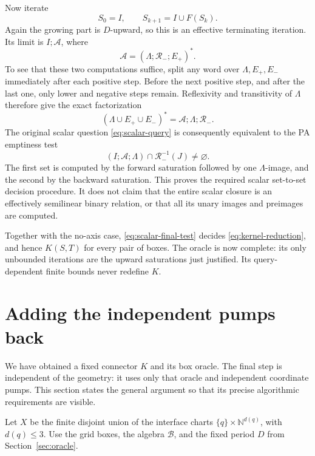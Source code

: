 \documentclass[11pt,a4paper]{article}
\theoremstyle{remark}
\newcommand{\N}{\mathbb N}
\begin{document}
Now iterate
\begin{equation}
 S_0=I,\qquad S_{k+1}=I\cup F(S_k).
 \label{eq:scalar-forward-saturation}
\end{equation}
Again the growing part is \(D\)-upward, so this is an effective
terminating iteration.  Its limit is \(I;\mathcal A\), where
\[
 \mathcal A=(\Lambda;\mathcal R_-;E_+)^*.
\]
To see that these two computations suffice, split any word over
\(\Lambda,E_+,E_-\) immediately after each positive step.  Before
the next positive step, and after the last one, only lower and negative
steps remain.  Reflexivity and transitivity of \(\Lambda\) therefore
give the exact factorization
\begin{equation}
 (\Lambda\cup E_+\cup E_-)^*
   =\mathcal A;\Lambda;\mathcal R_-.
 \label{eq:scalar-factorization}
\end{equation}
The original scalar question \eqref{eq:scalar-query} is consequently
equivalent to the PA emptiness test
\begin{equation}
 (I;\mathcal A;\Lambda)\cap\mathcal R_-^{-1}(J)
 \neq\varnothing.
 \label{eq:scalar-final-test}
\end{equation}
The first set is computed by the forward saturation followed by one
\(\Lambda\)-image, and the second by the backward saturation.
This proves the required scalar set-to-set decision procedure.  It
does not claim that the entire scalar closure is an effectively
semilinear binary relation, or that all its unary images and preimages
are computed.


Together with the no-axis case,
\eqref{eq:scalar-final-test} decides \eqref{eq:kernel-reduction}, and
hence \(K(S,T)\) for every pair of boxes. The oracle is now complete:
its only unbounded iterations are the upward saturations just justified.
Its query-dependent finite bounds never redefine \(K\).

\section{Adding the independent pumps back}\label{sec:completion}

We have obtained a fixed connector \(K\) and its box oracle. The final
step is independent of the geometry: it uses only that oracle and
independent coordinate pumps. This section states the general argument
so that its precise algorithmic requirements are visible.

Let \(X\) be the finite disjoint union of the interface charts
\(\{q\}\times\N^{d(q)}\), with \(d(q)\le3\). Use the grid boxes,
the algebra \(\mathcal B\), and the fixed period \(D\) from
Section~\ref{sec:oracle}.
\end{document}
